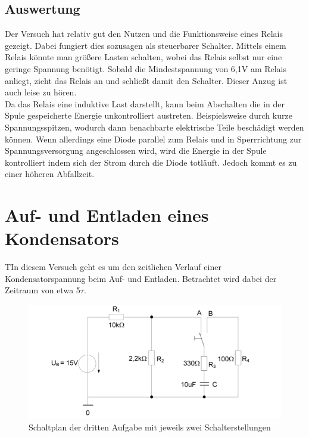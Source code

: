 \documentclass{article}
\begin{document}
\subsection{Auswertung}
Der Versuch hat relativ gut den Nutzen und die Funktionsweise eines Relais gezeigt. Dabei fungiert dies sozusagen als steuerbarer Schalter.
Mittels einem Relais könnte man größere Lasten schalten, wobei das Relais selbst nur eine geringe Spannung benötigt. Sobald die Mindestspannung von 6,1V am Relais anliegt, zieht das Relais an und schließt damit den Schalter. Dieser Anzug ist auch leise zu hören.\\
Da das Relais eine induktive Last darstellt, kann beim Abschalten die in der Spule gespeicherte Energie unkontrolliert austreten. Beispielsweise durch kurze Spannungsspitzen, wodurch dann benachbarte elektrische Teile beschädigt werden können.
Wenn allerdings eine Diode parallel zum Relais und in Sperrrichtung zur Spannungsversorgung angeschlossen wird, wird die Energie in der Spule kontrolliert indem sich der Strom durch die Diode totläuft. 
Jedoch kommt es zu einer höheren Abfallzeit.

\newpage

\section{Auf- und Entladen eines Kondensators}
\begin{task}
TIn diesem Versuch geht es um den zeitlichen Verlauf einer Kondensatorspannung beim Auf- und Entladen. Betrachtet wird dabei der Zeitraum von etwa 5$\tau$.
\end{task}
\begin{figure}[h]
    \begin{center}
        \includegraphics{../assets/images/ET2P4/Schaltplan3.PNG}
        \caption{Schaltplan der dritten Aufgabe mit jeweils zwei Schalterstellungen}
    \end{center}
\end{figure}
\end{document}

